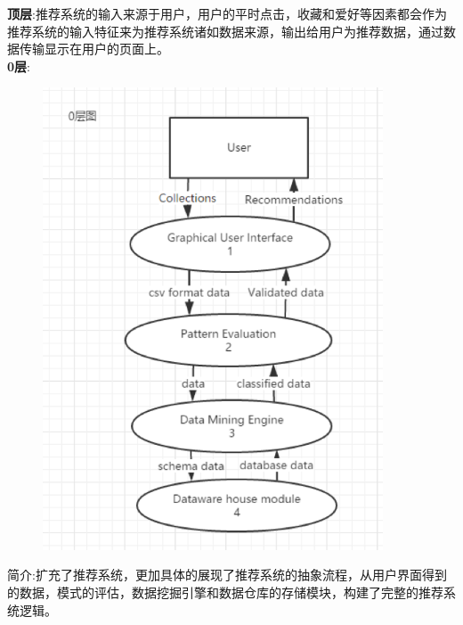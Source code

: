 \documentclass[UTF8]{ctexart}
\begin{document}
\textbf{顶层}:推荐系统的输入来源于用户，用户的平时点击，收藏和爱好等因素都会作为推荐系统的输入特征来为推荐系统诸如数据来源，输出给用户为推荐数据，通过数据传输显示在用户的页面上。\\

\textbf{0层}:\\
\begin{figure}[H]
\centering
\includegraphics[width = 0.9\textwidth]{recommend0-df.png}
\end{figure}
简介:扩充了推荐系统，更加具体的展现了推荐系统的抽象流程，从用户界面得到的数据，模式的评估，数据挖掘引擎和数据仓库的存储模块，构建了完整的推荐系统逻辑。\\
\end{document}
